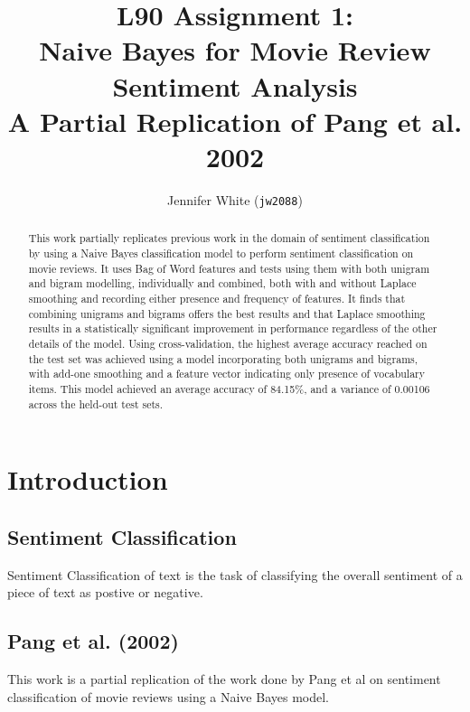 \documentclass[twocolumn]{article}
\title{ L90 Assignment 1:\\
	Naive Bayes for Movie Review Sentiment Analysis \\
	\large A Partial Replication of Pang et al. 2002 }
\author{Jennifer White (\texttt{jw2088})}
\begin{document}
\maketitle
\begin{abstract}
This work partially replicates previous work in the domain of sentiment classification by using a Naive Bayes classification model to perform sentiment classification on movie reviews. It uses Bag of Word features and tests using them with both unigram and bigram modelling, individually and combined, both with and without Laplace smoothing and recording either  presence and frequency of features. It finds that combining unigrams and bigrams offers the best results and that Laplace smoothing results in a statistically significant improvement in performance regardless of the other details of the model. Using cross-validation, the highest average accuracy reached on the test set was achieved using a model incorporating both unigrams and bigrams, with add-one smoothing and a feature vector indicating only presence of vocabulary items. This model achieved an average accuracy of 84.15\%, and a variance of 0.00106 across the held-out test sets. 
\end{abstract}

\section{Introduction}

\subsection{Sentiment Classification}

Sentiment Classification of text is the task of classifying the overall sentiment of a piece of text as postive or negative.

\subsection{Pang et al. (2002)}

This work is a partial replication of the work done by Pang et al \cite{pang} on sentiment classification of movie reviews using a Naive Bayes model. 
\end{document}
